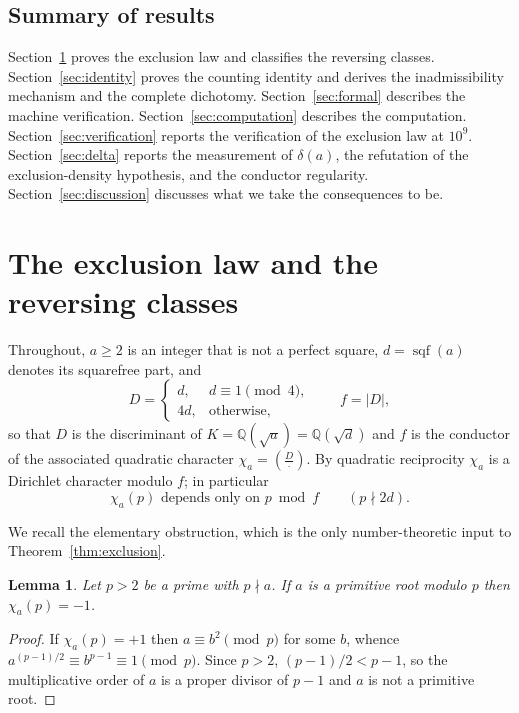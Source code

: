 \documentclass[11pt,reqno]{amsart}
\theoremstyle{plain}
\newtheorem{lemma}[theorem]{Lemma}
\theoremstyle{definition}
\DeclareMathOperator{\sqf}{sqf}
\newcommand{\Leg}[2]{\left(\frac{#1}{#2}\right)}
\newcommand{\Q}{\mathbb{Q}}
\begin{document}
\subsection*{Summary of results}
Section~\ref{sec:exclusion} proves the exclusion law and classifies the
reversing classes. Section~\ref{sec:identity} proves the counting identity and
derives the inadmissibility mechanism and the complete dichotomy.
Section~\ref{sec:formal} describes the machine verification.
Section~\ref{sec:computation} describes the computation.
Section~\ref{sec:verification} reports the verification of the exclusion law at
$10^9$. Section~\ref{sec:delta} reports the measurement of $\delta(a)$, the
refutation of the exclusion-density hypothesis, and the conductor
regularity. Section~\ref{sec:discussion} discusses what we take the
consequences to be.

\section{The exclusion law and the reversing classes}
\label{sec:exclusion}

Throughout, $a \ge 2$ is an integer that is not a perfect square, $d = \sqf(a)$
denotes its squarefree part, and
\begin{equation}
\label{eq:disc}
  D = \begin{cases} d, & d \equiv 1 \pmod 4,\\ 4d, & \text{otherwise,}\end{cases}
  \qquad f = |D|,
\end{equation}
so that $D$ is the discriminant of $K = \Q(\sqrt{a}) = \Q(\sqrt{d})$ and $f$ is
the conductor of the associated quadratic character
$\chi_a = \Leg{D}{\cdot}$. By quadratic reciprocity $\chi_a$ is a Dirichlet
character modulo $f$; in particular
\begin{equation}
\label{eq:modf}
  \chi_a(p) \text{ depends only on } p \bmod f \qquad (p \nmid 2d).
\end{equation}

We recall the elementary obstruction, which is the only number-theoretic input
to Theorem~\ref{thm:exclusion}.

\begin{lemma}
\label{lem:obstruction}
Let $p > 2$ be a prime with $p \nmid a$. If $a$ is a primitive root modulo $p$
then $\chi_a(p) = -1$.
\end{lemma}

\begin{proof}
If $\chi_a(p) = +1$ then $a \equiv b^2 \pmod p$ for some $b$, whence
$a^{(p-1)/2} \equiv b^{p-1} \equiv 1 \pmod p$. Since $p > 2$, $(p-1)/2 < p-1$,
so the multiplicative order of $a$ is a proper divisor of $p - 1$ and $a$ is not
a primitive root.
\end{proof}
\end{document}
